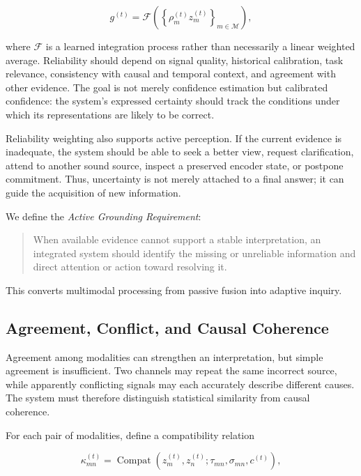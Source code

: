 \begin{equation}
g^{(t)}
=
\mathcal{F}
\left(
\left\{
\rho_m^{(t)} z_m^{(t)}
\right\}_{m\in\mathcal{M}}
\right),
\label{eq:reliability-fusion}
\end{equation}

where $\mathcal{F}$ is a learned integration process rather than necessarily a linear weighted average. Reliability should depend on signal quality, historical calibration, task relevance, consistency with causal and temporal context, and agreement with other evidence. The goal is not merely confidence estimation but calibrated confidence: the system's expressed certainty should track the conditions under which its representations are likely to be correct.

Reliability weighting also supports active perception. If the current evidence is inadequate, the system should be able to seek a better view, request clarification, attend to another sound source, inspect a preserved encoder state, or postpone commitment. Thus, uncertainty is not merely attached to a final answer; it can guide the acquisition of new information.

We define the \emph{Active Grounding Requirement}:

\begin{quote}
When available evidence cannot support a stable interpretation, an integrated system should identify the missing or unreliable information and direct attention or action toward resolving it.
\end{quote}

This converts multimodal processing from passive fusion into adaptive inquiry.

\subsection{Agreement, Conflict, and Causal Coherence}
\label{subsec:agreement-conflict-coherence}

Agreement among modalities can strengthen an interpretation, but simple agreement is insufficient. Two channels may repeat the same incorrect source, while apparently conflicting signals may each accurately describe different causes. The system must therefore distinguish statistical similarity from causal coherence.

For each pair of modalities, define a compatibility relation

\begin{equation}
\kappa_{mn}^{(t)}
=
\operatorname{Compat}
\left(
z_m^{(t)},z_n^{(t)};
\tau_{mn},\sigma_{mn},c^{(t)}
\right),
\label{eq:crossmodal-compatibility}
\end{equation}

